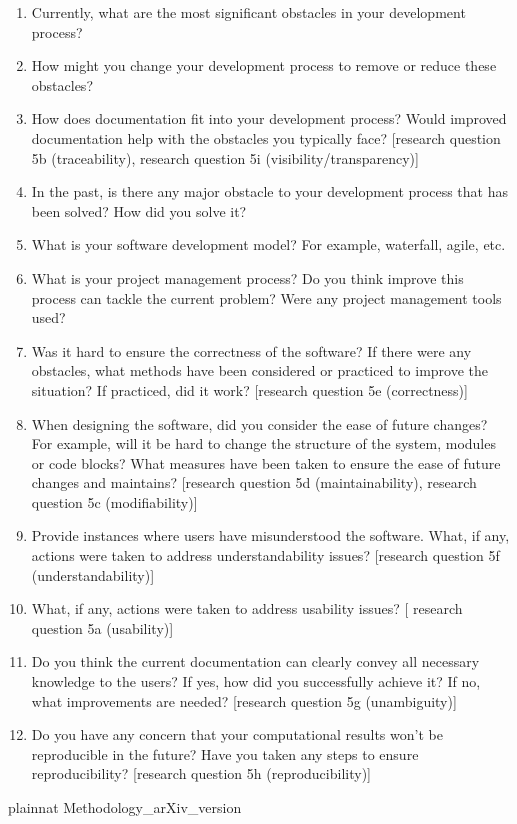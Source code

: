 \documentclass[letterpaper,cleveref]{lipics-v2019}
\begin{document}
\begin{enumerate}
\item Currently, what are the most significant obstacles in your development
process?
\item How might you change your development process to remove or reduce these
obstacles?
\item How does documentation fit into your development process? Would improved
documentation help with the obstacles you typically face? [research question 5b (traceability),
research question 5i (visibility/transparency)]
\item In the past, is there any major obstacle to your development process that
has been solved? How did you solve it?
\item What is your software development model? For example, waterfall, agile,
etc.
\item What is your project management process? Do you think improve this process
can tackle the current problem? Were any project management tools used?
\item Was it hard to ensure the correctness of the software? If there were any
 obstacles, what methods have been considered or practiced to improve the
 situation? If practiced, did it work? [research question 5e (correctness)]
\item When designing the software, did you consider the ease of future changes?
 For example, will it be hard to change the structure of the system, modules or
 code blocks? What measures have been taken to ensure the ease of future changes
 and maintains? [research question 5d (maintainability), 
 research question 5c (modifiability)]
\item Provide instances where users have misunderstood the software. What, if
any, actions were taken to address understandability issues? [research question
5f (understandability)]
\item What, if any, actions were taken to address usability issues? [
research question 5a (usability)]
\item Do you think the current documentation can clearly convey all necessary
knowledge to the users? If yes, how did you successfully achieve it? If no, what
improvements are needed? [research question 5g (unambiguity)]
\item Do you have any concern that your computational results won't be
reproducible in the future? Have you taken any steps to ensure reproducibility?
[research question 5h (reproducibility)]
\end{enumerate}

\newpage

 {plainnat}
 {Methodology_arXiv_version}
\end{document}
